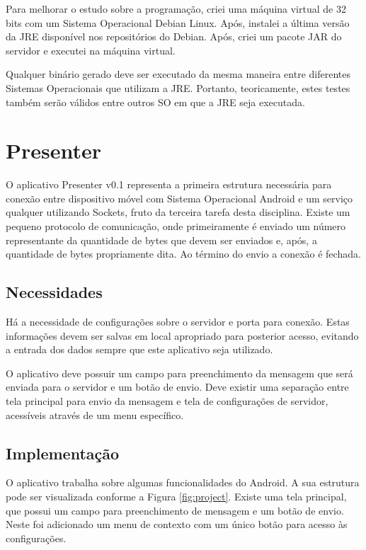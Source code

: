 \documentclass{article}
\begin{document}
Para melhorar o estudo sobre a programação, criei uma máquina virtual de 32 bits
com um Sistema Operacional Debian Linux. Após, instalei a última versão da JRE
disponível nos repositórios do Debian. Após, criei um pacote JAR do servidor e
executei na máquina virtual.

Qualquer binário gerado deve ser executado da mesma maneira entre diferentes
Sistemas Operacionais que utilizam a JRE. Portanto, teoricamente, estes testes
também serão válidos entre outros SO em que a JRE seja executada.

\section{Presenter}
\label{sec:presenter}

O aplicativo Presenter v0.1 representa a primeira estrutura necessária para
conexão entre dispositivo móvel com Sistema Operacional Android e um serviço
qualquer utilizando Sockets, fruto da terceira tarefa desta disciplina. Existe
um pequeno protocolo de comunicação, onde primeiramente é enviado um número
representante da quantidade de bytes que devem ser enviados e, após, a
quantidade de bytes propriamente dita. Ao término do envio a conexão é fechada.

\subsection{Necessidades}

Há a necessidade de configurações sobre o servidor e porta para conexão. Estas
informações devem ser salvas em local apropriado para posterior acesso, evitando
a entrada dos dados sempre que este aplicativo seja utilizado.

O aplicativo deve possuir um campo para preenchimento da mensagem que será
enviada para o servidor e um botão de envio. Deve existir uma separação entre
tela principal para envio da mensagem e tela de configurações de servidor,
acessíveis através de um menu específico.

\subsection{Implementação}

O aplicativo trabalha sobre algumas funcionalidades do Android. A sua estrutura
pode ser visualizada conforme a Figura \ref{fig:project}. Existe uma tela
principal, que possui um campo para preenchimento de mensagem e um botão de
envio. Neste foi adicionado um menu de contexto com um único botão para acesso
às configurações.
\end{document}

